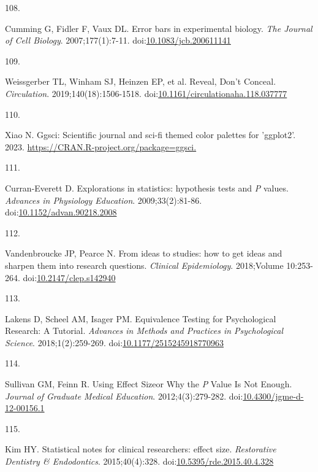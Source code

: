 \documentclass[
]{book}
\newlength{\cslhangindent}
\newlength{\csllabelwidth}
\newlength{\cslentryspacingunit} %
\newenvironment{CSLReferences}[2] %
 {%
  \setlength{\parindent}{0pt}
  \ifodd #1
  \let\oldpar\par
  \def\par{\hangindent=\cslhangindent\oldpar}
  \fi
  \setlength{\parskip}{#2\cslentryspacingunit}
 }%
 {}
\newcommand{\CSLLeftMargin}[1]{\parbox[t]{\csllabelwidth}{#1}}
\newcommand{\CSLRightInline}[1]{\parbox[t]{\linewidth - \csllabelwidth}{#1}\break}
\begin{document}
\begin{CSLReferences}{0}{0}
\leavevmode{}%
\CSLLeftMargin{108. }%
\CSLRightInline{Cumming G, Fidler F, Vaux DL. Error bars in experimental biology. \emph{The Journal of Cell Biology}. 2007;177(1):7-11. doi:\href{https://doi.org/10.1083/jcb.200611141}{10.1083/jcb.200611141}}

\leavevmode{}%
\CSLLeftMargin{109. }%
\CSLRightInline{Weissgerber TL, Winham SJ, Heinzen EP, et al. Reveal, Don{'}t Conceal. \emph{Circulation}. 2019;140(18):1506-1518. doi:\href{https://doi.org/10.1161/circulationaha.118.037777}{10.1161/circulationaha.118.037777}}

\leavevmode{}%
\CSLLeftMargin{110. }%
\CSLRightInline{Xiao N. Ggsci: Scientific journal and sci-fi themed color palettes for 'ggplot2'. 2023. \href{https://CRAN.R-project.org/package=ggsci}{https://CRAN.R-project.org/package=ggsci.}}

\leavevmode{}%
\CSLLeftMargin{111. }%
\CSLRightInline{Curran-Everett D. Explorations in statistics: hypothesis tests and {\emph{P}} values. \emph{Advances in Physiology Education}. 2009;33(2):81-86. doi:\href{https://doi.org/10.1152/advan.90218.2008}{10.1152/advan.90218.2008}}

\leavevmode{}%
\CSLLeftMargin{112. }%
\CSLRightInline{Vandenbroucke JP, Pearce N. From ideas to studies: how to get ideas and sharpen them into research questions. \emph{Clinical Epidemiology}. 2018;Volume 10:253-264. doi:\href{https://doi.org/10.2147/clep.s142940}{10.2147/clep.s142940}}

\leavevmode{}%
\CSLLeftMargin{113. }%
\CSLRightInline{Lakens D, Scheel AM, Isager PM. Equivalence Testing for Psychological Research: A Tutorial. \emph{Advances in Methods and Practices in Psychological Science}. 2018;1(2):259-269. doi:\href{https://doi.org/10.1177/2515245918770963}{10.1177/2515245918770963}}

\leavevmode{}%
\CSLLeftMargin{114. }%
\CSLRightInline{Sullivan GM, Feinn R. Using Effect Size{\textemdash}or Why the {\emph{P}} Value Is Not Enough. \emph{Journal of Graduate Medical Education}. 2012;4(3):279-282. doi:\href{https://doi.org/10.4300/jgme-d-12-00156.1}{10.4300/jgme-d-12-00156.1}}

\leavevmode{}%
\CSLLeftMargin{115. }%
\CSLRightInline{Kim HY. Statistical notes for clinical researchers: effect size. \emph{Restorative Dentistry \& Endodontics}. 2015;40(4):328. doi:\href{https://doi.org/10.5395/rde.2015.40.4.328}{10.5395/rde.2015.40.4.328}}


\end{CSLReferences}
\end{document}
